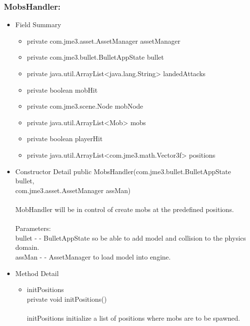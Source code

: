 \documentclass[letterpaper]{article}
\begin{document}
						\vspace{0.2in}
						\subsubsection*{MobsHandler:}
						\vspace{0.1in}
							\begin{itemize}
								\item	Field Summary
										\begin{itemize}
											\item	private com.jme3.asset.AssetManager	assetManager 
											\item	private com.jme3.bullet.BulletAppState	bullet 
											\item	private java.util.ArrayList<java.lang.String>	landedAttacks 
											\item	private boolean	mobHit 
											\item	private com.jme3.scene.Node	mobNode 
											\item	private java.util.ArrayList<Mob>	mobs 
											\item	private boolean	playerHit 
											\item	private java.util.ArrayList<com.jme3.math.Vector3f>	positions 
										\end{itemize}
								\item	Constructor Detail
										public MobsHandler(com.jme3.bullet.BulletAppState bullet, \\
		          com.jme3.asset.AssetManager assMan) \\ \\
										MobHandler will be in control of create mobs at the predefined positions. \\ \\
										Parameters: \\
										bullet - - BulletAppState so be able to add model and collision to the physics domain. \\
										assMan - - AssetManager to load model into engine.
								\item	Method Detail
										\begin{itemize}
											\item	initPositions \\
													private void initPositions() \\ \\
													initPositions initialize a list of positions where mobs are to be spawned.

\end{itemize}
\end{itemize}
\end{document}
